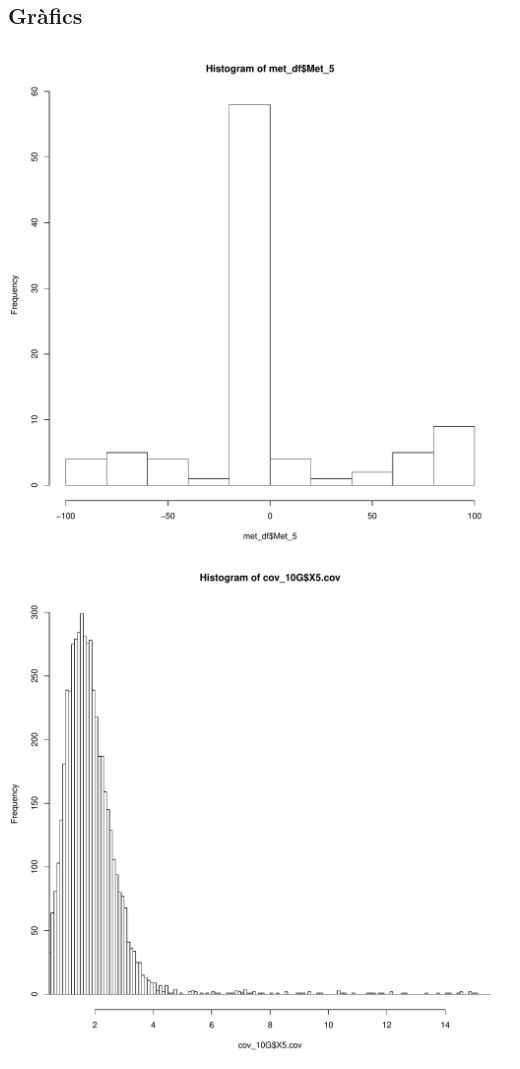 \documentclass{article}\usepackage[]{graphicx}\usepackage[]{color}
\newenvironment{knitrout}{}{} %
\begin{document}
\subsection{Gràfics}
\begin{knitrout}
\color{fgcolor}

{\centering \includegraphics[width=.9\linewidth]{figure/minimal-cor_graf-1} 
\includegraphics[width=.9\linewidth]{figure/minimal-cor_graf-2} 
}
\end{knitrout}
\end{document}
